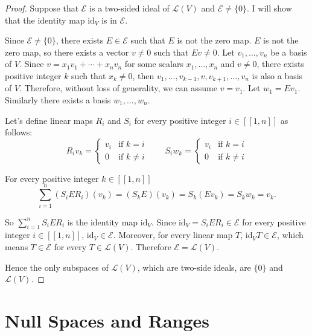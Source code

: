 \begin{proof}
    Suppose that $\mathcal{E}$ is a two-sided ideal of $\mathcal{L}(V)$ and $\mathcal{E}\ne \{0\}$. I will show that the identity map $\text{id}_{V}$ is in $\mathcal{E}$.

    Since $\mathcal{E}\ne \{0\}$, there exists $E\in\mathcal{E}$ such that $E$ is not the zero map. $E$ is not the zero map, so there exists a vector $v\ne 0$ such that $Ev\ne 0$. Let $v_{1}, \ldots, v_{n}$ be a basis of $V$. Since $v = x_{1}v_{1} + \cdots + x_{n}v_{n}$ for some scalars $x_{1}, \ldots, x_{n}$ and $v\ne 0$, there exists positive integer $k$ such that $x_{k}\ne 0$, then $v_{1}, \ldots, v_{k-1}, v, v_{k+1}, \ldots, v_{n}$ is also a basis of $V$. Therefore, without loss of generality, we can assume $v = v_{1}$. Let $w_{1} = Ev_{1}$. Similarly there exists a basis $w_{1}, \ldots, w_{n}$.

    Let's define linear maps $R_{i}$ and $S_{i}$ for every positive integer $i\in [\![ 1, n ]\!]$ as follows:
    \[
        R_{i}v_{k} = \begin{cases}
            v_{i} & \text{if $k = i$}  \\
            0     & \text{if $k\ne i$}
        \end{cases}
        \qquad
        S_{i}w_{k} = \begin{cases}
            v_{i} & \text{if $k = i$}  \\
            0     & \text{if $k\ne i$}
        \end{cases}
    \]

    For every positive integer $k\in [\![ 1, n ]\!]$
    \[
        \sum^{n}_{i=1}(S_{i}ER_{i})(v_{k}) = (S_{k}E)(v_{k}) = S_{k}(Ev_{k}) = S_{k}w_{k} = v_{k}.
    \]

    So $\sum^{n}_{i=1}S_{i}ER_{i}$ is the identity map $\text{id}_{V}$. Since $\text{id}_{V} = S_{i}ER_{i}\in\mathcal{E}$ for every positive integer $i\in [\![ 1, n ]\!]$, $\text{id}_{V}\in\mathcal{E}$. Moreover, for every linear map $T$, $\text{id}_{V}T\in\mathcal{E}$, which means $T\in\mathcal{E}$ for every $T\in\mathcal{L}(V)$. Therefore $\mathcal{E} = \mathcal{L}(V)$.

    Hence the only subspaces of $\mathcal{L}(V)$, which are two-side ideals, are $\{0\}$ and $\mathcal{L}(V)$.
\end{proof}
\newpage

\section{Null Spaces and Ranges}

